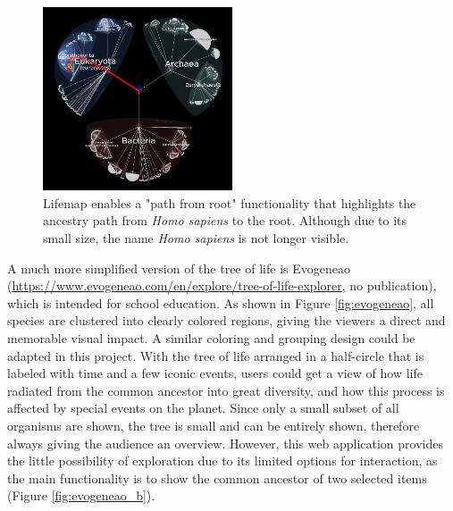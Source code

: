 \documentclass[11pt, a4paper,oneside,chapterprefix=false]{scrbook}
\begin{document}
\begin{figure}[h]
	\centering
	\includegraphics[width=0.5\textwidth]{figures/related_work/lifemap}
	\caption{Lifemap enables a "path from root" functionality that highlights the ancestry path from \textit{Homo sapiens} to the root. Although due to its small size, the name \textit{Homo sapiens} is not longer visible.}
	\label{fig:lifemap}
\end{figure}

A much more simplified version of the tree of life is Evogeneao (\url{https://www.evogeneao.com/en/explore/tree-of-life-explorer}, no publication), which is intended for school education. As shown in Figure \ref{fig:evogeneao}, all species are clustered into clearly colored regions, giving the viewers a direct and memorable visual impact. A similar coloring and grouping design could be adapted in this project. With the tree of life arranged in a half-circle that is labeled with time and a few iconic events, users could get a view of how life radiated from the common ancestor into great diversity, and how this process is affected by special events on the planet. Since only a small subset of all organisms are shown, the tree is small and can be entirely shown, therefore always giving the audience an overview. However, this web application provides the little possibility of exploration due to its limited options for interaction, as the main functionality is to show the common ancestor of two selected items (Figure \ref{fig:evogeneao_b}).\\
\end{document}
